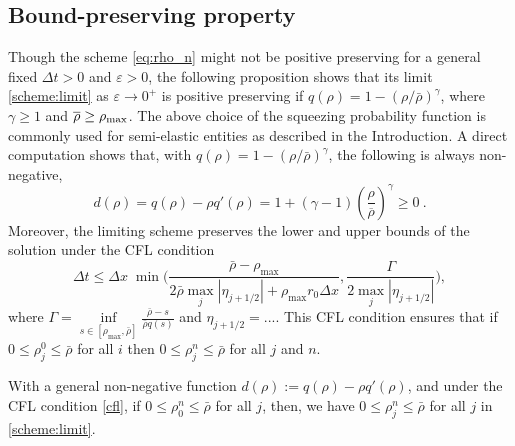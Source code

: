 \documentclass[review,onefignum,onetabnum]{siamart220329}
\newcommand {\e}  {\varepsilon}
\newcommand {\dt}   {\Delta t}
\newcommand{\XR} {\color{red}}
\newcommand{\DP}{\color{myblue}}
\begin{document}
\subsection{{Bound-preserving property}}
{\DP Though the scheme \cref{eq:rho_n} might not be positive preserving for a general fixed $\dt > 0$ and $\e>0$, 
the following proposition shows that its limit \cref{scheme:limit} as $\e\to 0^+$ is positive preserving if $q(\rho) = 1 - (\rho / \bar{\rho})^\gamma$, where $\gamma\ge1$ and $\overline{\rho}\ge\rho_{\rm{max}}$.
 The above choice of the squeezing probability function is commonly used  for semi-elastic entities as described in the Introduction. 
 A direct computation shows that, with $q(\rho)= 1 - (\rho / \bar{\rho})^\gamma$, the following is always non-negative, 
\begin{equation*}
    d(\rho)= q(\rho) - \rho q'(\rho) = 1 + (\gamma-1)\left(\frac{\rho}{\overline{\rho}}\right)^{\gamma} \ge 0\ .
\end{equation*}
Moreover, the limiting scheme preserves the lower and upper bounds of the solution under the CFL condition 
\begin{equation}\label{cfl}
\Delta t \leq \Delta x \; \min \big(\frac{\bar{\rho} - \rho_{\max}}{2 \bar{\rho} \max_j |\eta_{j+1/2}| + \rho_{\max} r_0 \Delta x}, \frac{\Gamma}{2 \max_j |\eta_{j+1/2}|} \big),
\end{equation}
\noindent where $\Gamma = \underset{s\in [\rho_{\max}, \bar{\rho}]}{\inf} \frac{\bar{\rho} - s}{\bar{\rho} q(s)}$ {\XR and $\eta_{j+1/2}= ...$}. This CFL condition ensures that if $0 \leq \rho_j^0 \leq \bar{\rho}$ for all $i$ then $0 \leq \rho_j^n \leq \bar{\rho}$ for all $j$ and $n$.
}
\begin{proposition} 
 {\DP   With a general non-negative function $d(\rho) :=q(\rho) - \rho q'(\rho)$, and under the CFL condition \eqref{cfl}, if $0 \leq \rho_0^n \leq \bar{\rho}$ for all $j$, then, we have 
    $0 \leq \rho_j^n \leq \bar{\rho}$ for all $j$ in \cref{scheme:limit}.}
\end{proposition}
\end{document}
